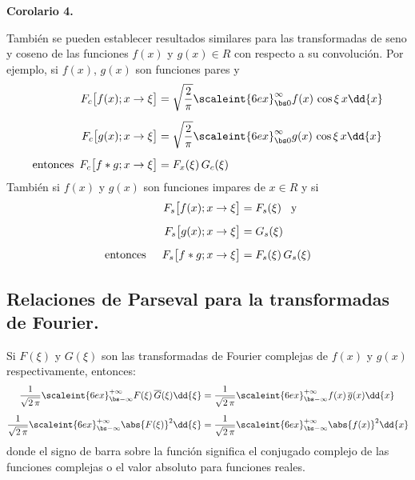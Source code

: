 \textbf{Corolario 4.}

También se pueden establecer resultados similares para las transformadas de seno y coseno de las funciones $f (x)$ y $g (x) \in R$ con respecto a su convolución. Por ejemplo, si $f (x)$, $g (x)$ son funciones pares y
\begin{align}
\begin{aligned}[b]
F_{c} \big[f(x); x \to \xi \big] &= \sqrt{\dfrac{2}{\pi}} \scaleint{6ex}_{\bs 0}^{\infty} f(x) \, \cos \xi \, x \dd{x} \\[0.5em]
F_{c} \big[g(x); x \to \xi \big] &= \sqrt{\dfrac{2}{\pi}} \scaleint{6ex}_{\bs 0}^{\infty} g(x) \, \cos \xi \, x \dd{x} \\[0.5em]
\mbox{entonces} \hspace{0.5em} F_{c} \big[f * g; x \to \xi \big] &= F_{x}(\xi) \, G_{c}(\xi)
\end{aligned}
\label{eq:ecuacion_01_28}
\end{align}
También si $f(x)$ y $g(x)$ son funciones impares de $x \in R$ y si
\begin{align}
\begin{aligned}[b]
F_{s} \big[f(x); x \to \xi \big] &= F_{s}(\xi) \hspace{0.3cm} \mbox{y} \\[0.5em]
F_{s} \big[g(x); x \to \xi \big] &= G_{s}(\xi) \\[0.5em]
\mbox{entonces} \hspace{0.5cm} F_{s} \big[f * g; x \to \xi \big] &= F_{s} (\xi) \, G_{s}(\xi) 
\end{aligned}
\label{eq:ecuacion_01_29}
\end{align}

\subsection{Relaciones de Parseval para la transformadas de Fourier.}

Si $F(\xi)$ y $G(\xi)$ son las transformadas de Fourier complejas de $f(x)$ y $g(x)$ respectivamente, entonces:
\begin{align}
\dfrac{1}{\sqrt{2 \, \pi}} \scaleint{6ex}_{\bs -\infty}^{+\infty} F(\xi) \, \overline{G}(\xi) \dd{\xi} &= \dfrac{1}{\sqrt{2 \, \pi}} \scaleint{6ex}_{\bs -\infty}^{+\infty} f(x) \, \overline{g}(x) \dd{x} \label{eq:ecuacion_01_30} \\[0.5em]
\dfrac{1}{\sqrt{2 \, \pi}} \scaleint{6ex}_{\bs -\infty}^{+\infty} \abs{F(\xi)}^{2} \dd{\xi} &= \dfrac{1}{\sqrt{2 \, \pi}} \scaleint{6ex}_{\bs -\infty}^{+\infty} \abs{f(x)}^{2} \dd{x} \label{eq:ecuacion_01_31}
\end{align}
donde el signo de barra sobre la función significa el conjugado complejo de las funciones complejas o el valor absoluto para funciones reales.

